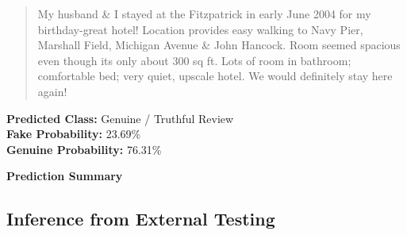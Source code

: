 \documentclass[12pt,a4paper]{report}
\begin{document}
\begin{quote}
My husband \& I stayed at the Fitzpatrick in early June 2004 for my
birthday-great hotel! Location provides easy walking to Navy Pier,
Marshall Field, Michigan Avenue \& John Hancock. Room seemed spacious
even though its only about 300 sq ft. Lots of room in bathroom;
comfortable bed; very quiet, upscale hotel. We would definitely stay
here again!
\end{quote}

\noindent
\textbf{Predicted Class:} Genuine / Truthful Review \\
\textbf{Fake Probability:} 23.69\% \\
\textbf{Genuine Probability:} 76.31\%

\vspace{0.5cm}
\noindent\textbf{Prediction Summary}

\begin{table}[H]
\centering
\caption{Prediction Results for Selected External Reviews}
\label{tab:unseen_predictions}

\end{table}

\subsection{Inference from External Testing}
\end{document}
